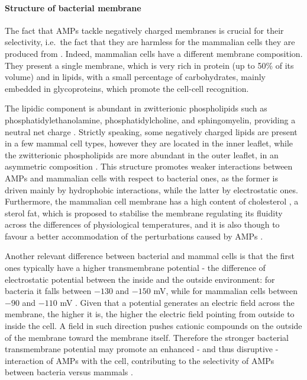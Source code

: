 \paragraph{Structure of bacterial membrane}
The fact that AMPs tackle negatively charged membranes is crucial for their selectivity, i.e.\ the fact that they are harmless for the mammalian cells they are produced from \cite{Glukhov2005}. Indeed, mammalian cells have a different membrane composition. They present a single membrane, which is very rich in protein (up to 50\% of its volume) and in lipids, with a small percentage of carbohydrates, mainly embedded in glycoproteins, which promote the cell-cell recognition.

The lipidic component is abundant in zwitterionic phospholipids such as phosphatidylethanolamine, phosphatidylcholine, and sphingomyelin, providing a neutral net charge \cite{Spector1985,vanMeer2008}.
%
Strictly speaking, some negatively charged lipids are present in a few mammal cell types, however they are located in the inner leaflet, while the zwitterionic phospholipids are more abundant in the outer leaflet, in an asymmetric composition \cite{???}.
%
This structure promotes weaker interactions between AMPs and mammalian cells with respect to bacterial ones, as the former is driven mainly by hydrophobic interactions, while the latter by electrostatic ones.
%
Furthermore, the mammalian cell membrane has a high content of cholesterol \cite{Yeaman2003, Lai2009}, a sterol fat, which is proposed to stabilise the membrane regulating its fluidity across the differences of physiological temperatures, and it is also though to favour a better accommodation of the perturbations caused by AMPs \cite{Zasloff2002}.

Another relevant difference between bacterial and mammal cells is that the first ones typically have a higher transmembrane potential - the difference of electrostatic potential between the inside and the outside environment: for bacteria it falls between $-130$ and $-150$ mV, while for mammalian cells between $-90$ and $-110$ mV \cite{Yeaman2003,Matsuzaki2009,Ebenhan2014}.
%
Given that a potential generates an electric field across the membrane, the higher it is, the higher the electric field pointing from outside to inside the cell. A field in such direction pushes cationic compounds on the outside of the membrane toward the membrane itself. Therefore the stronger bacterial transmembrane potential may promote an enhanced - and thus disruptive - interaction of AMPs with the cell, contributing to the selectivity of AMPs between bacteria versus mammals \cite{Yeaman2003}.


